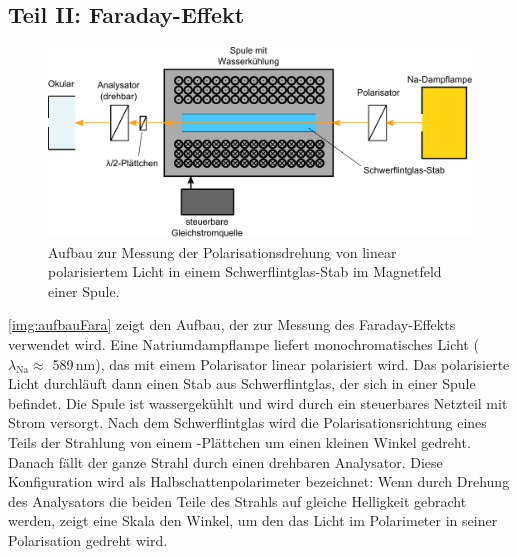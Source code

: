 \subsection{Teil II: Faraday-Effekt}
\label{sub:setup:faraday}

\begin{figure}[H]
\begin{center}
  \includegraphics[width=\textwidth]{../img/aufbauFara.pdf}
  \caption{Aufbau zur Messung der Polarisationsdrehung von linear polarisiertem Licht 
  in einem Schwerflintglas-Stab im Magnetfeld einer Spule.}
  \label{img:aufbauFara}
\end{center}
\end{figure}

\autoref{img:aufbauFara} zeigt den Aufbau, der zur Messung des Faraday-Effekts verwendet wird.
Eine Natriumdampflampe liefert monochromatisches Licht ($\lambda_{\text{Na}}\approx$ 589\,nm),
das mit einem Polarisator linear polarisiert wird.
Das polarisierte Licht durchläuft dann einen Stab aus Schwerflintglas,
der sich in einer Spule befindet.
Die Spule ist wassergekühlt und wird durch ein steuerbares Netzteil mit Strom versorgt.
Nach dem Schwerflintglas wird die Polarisationsrichtung eines Teils der Strahlung von einem
\textlambda\2-Plättchen um einen kleinen Winkel gedreht.
Danach fällt der ganze Strahl durch einen drehbaren Analysator.
Diese Konfiguration wird als Halbschattenpolarimeter bezeichnet:
Wenn durch Drehung des Analysators die beiden Teile des Strahls auf gleiche Helligkeit gebracht werden,
zeigt eine Skala den Winkel, um den das Licht im Polarimeter in seiner Polarisation gedreht wird.


